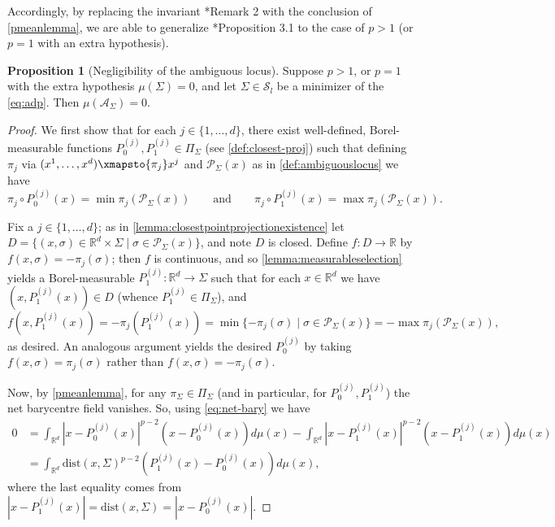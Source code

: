 \documentclass[preprint, reqno]{amsart}
\newcommand{\dist}{\mathrm{dist}}
\theoremstyle{definition}
\newtheorem{proposition}[definition]{Proposition}
\numberwithin{equation}{section}
\begin{document}
Accordingly, by replacing the invariant \cite{Delattre17}*{Remark 2}
with the conclusion of \cref{pmeanlemma}, we are able to generalize
\cite{Delattre17}*{Proposition 3.1} to the case of $p > 1$ (or $p =1$
with an extra hypothesis).

\begin{proposition}[Negligibility of the ambiguous
  locus]\label{ridgesetnegligable}
  Suppose $p > 1$, or $p=1$ with the extra hypothesis $\mu(\Sigma) =
  0$, and let $\Sigma \in \mathcal{S}_l$ be a minimizer of the
  \eqref{eq:adp}. Then $\mu(\mathcal{A}_{\Sigma}) = 0$.
\end{proposition}

\begin{proof}
  We first show that for each $j \in \{1, \dots, d\}$, there exist
  well-defined, Borel-measurable functions $P^{(j)}_{0}, P^{(j)}_{1}
  \in \Pi_\Sigma$ (see \cref{def:closest-proj}) such that defining
  $\pi_j$ via $(x^1, \ldots, x^d) \xmapsto{\pi_j} x^j$ and $\mathcal
  P_\Sigma(x)$ as in \cref{def:ambiguouslocus} we have
  \begin{equation*}
    \pi_j \circ P^{(j)}_{0}(x) = \min
    \pi_j(\mathcal{P}_{\Sigma}(x))
    \qquad \text{and} \qquad
    \pi_j \circ P^{(j)}_{1}(x) = \max
    \pi_j(\mathcal{P}_{\Sigma}(x)).
  \end{equation*}

  Fix a $j \in \{1, \dots, d\}$; as in
  \cref{lemma:closestpointprojectionexistence} let $D = \{(x, \sigma)
  \in \mathbb{R}^d\times \Sigma \mid \sigma \in
  \mathcal{P}_{\Sigma}(x)\}$, and note $D$ is closed. Define $f : D
  \to \mathbb{R}$ by $ f(x, \sigma) = -\pi_j(\sigma)$; then $f$ is
  continuous, and so \cref{lemma:measurableselection} yields a
  Borel-measurable $P^{(j)}_1 : \mathbb{R}^d \to \Sigma$ such that for
  each $x \in \mathbb R^d$ we have $(x, P^{(j)}_1(x)) \in D$
  (whence $P^{(j)}_1 \in \Pi_\Sigma$), and
  \[
    f(x, P^{(j)}_{1}(x)) = -\pi_j(P^{(j)}_1(x)) = \min
    \{-\pi_j(\sigma) \mid \sigma \in \mathcal P_\Sigma(x)\} =
    -\max \pi_j(\mathcal P_\Sigma(x)),
  \]
  as desired. An analogous argument yields the desired $P^{(j)}_{0}$
  by taking $f(x,\sigma) = \pi_j(\sigma)$ rather than $f(x,\sigma) =
  -\pi_j(\sigma)$.

  Now, by \cref{pmeanlemma}, for any $\pi_\Sigma \in \Pi_\Sigma$ (and
  in particular, for $P^{(j)}_0, P^{(j)}_1$) the net barycentre field
  vanishes. So, using \eqref{eq:net-bary} we have
  \begin{align}
    0
    &= \int_{\mathbb{R}^d}|x - P^{(j)}_{0}(x)|^{p-2}(x -
      P^{(j)}_{0}(x)) d \mu(x) - \int_{\mathbb{R}^d}| x-
      P^{(j)}_{1}(x)|^{p-2}(x - P^{(j)}_{1}(x))d \mu(x) \nonumber \\
    &= \int_{\mathbb{R}^d} \dist(x, \Sigma)^{p-2}(P^{(j)}_{1}(x) -
      P^{(j)}_{0}(x)) d \mu(x), \label{eq:xy-diff-expr}
  \end{align}
  where the last equality comes from $|x- P^{(j)}_{1}(x)| =
  \dist(x,\Sigma) = |x - P^{(j)}_{0}(x)|$.


\end{proof}
\end{document}
